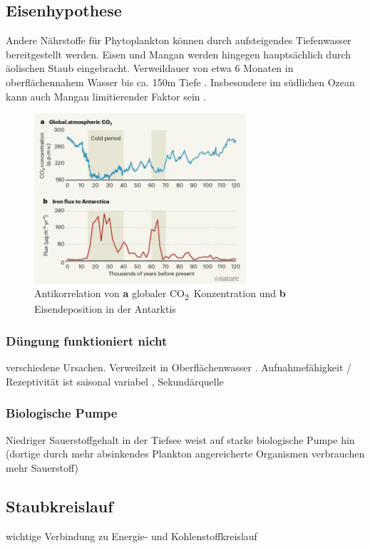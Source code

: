 \documentclass[12pt,a4paper,onecolumn]{scrartcl}
\newcommand{\cotwo}{CO\textsubscript{2}}
\begin{document}
\subsection{Eisenhypothese}
Andere Nährstoffe für Phytoplankton können durch aufsteigendes Tiefenwasser bereitgestellt werden. Eisen und Mangan werden hingegen hauptsächlich durch äolischen Staub eingebracht. Verweildauer von etwa 6 Monaten in oberflächennahem Wasser bis ca. 150m Tiefe
\citep{Hayes.2015}. Insbesondere im südlichen Ozean kann auch Mangan limitierender Faktor sein \citep{Browning.2021}.
\begin{figure}[ht]
\centering
\includegraphics[width=0.7\textwidth]{bilder/Stoll2020/antarctic_iron_global_co2.png}
\caption{Antikorrelation von \textbf{a} globaler \cotwo \ Konzentration und \textbf{b} Eisendeposition in der Antarktis}
\end{figure}
\subsubsection{Düngung funktioniert nicht}
verschiedene Ursachen. Verweilzeit in Oberflächenwasser \citep{Hayes.2015}. Aufnahmefähigkeit / Rezeptivität ist saisonal variabel \citep{Gabric.2016}, Sekundärquelle
\subsubsection{Biologische Pumpe}
Niedriger Sauerstoffgehalt in der Tiefsee weist auf starke biologische Pumpe hin (dortige durch mehr absinkendes Plankton angereicherte Organismen verbrauchen mehr Sauerstoff)

\subsection{Staubkreislauf}
wichtige Verbindung zu Energie- und Kohlenstoffkreislauf \citep{Shao.2011}
\end{document}
